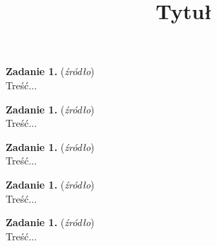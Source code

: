 \documentclass[10pt]{article}
\title{Tytuł}
\date{}
\author{}
\begin{document}
\maketitle

\noindent
\textbf{Zadanie 1. }(\textit{źródło})
\\ Treść...
\vspace{10pt}

\noindent
\textbf{Zadanie 1. }(\textit{źródło})
\\ Treść...
\vspace{10pt}

\noindent
\textbf{Zadanie 1. }(\textit{źródło})
\\ Treść...
\vspace{10pt}

\noindent
\textbf{Zadanie 1. }(\textit{źródło})
\\ Treść...
\vspace{10pt}

\noindent
\textbf{Zadanie 1. }(\textit{źródło})
\\ Treść...
\vspace{10pt}
\end{document}

